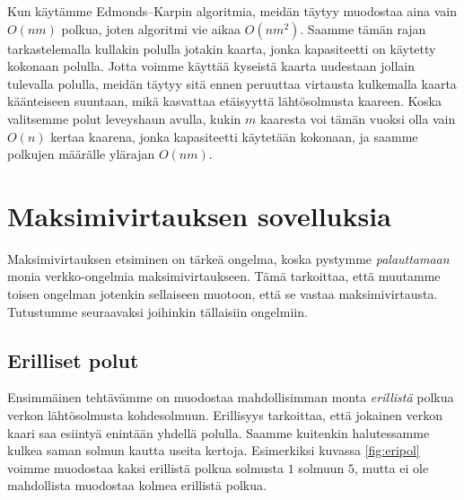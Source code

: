 Kun käytämme Edmonds–Karpin algoritmia,
meidän täytyy muodostaa aina vain $O(nm)$ polkua,
joten algoritmi vie aikaa $O(nm^2)$.
Saamme tämän rajan tarkastelemalla kullakin polulla
jotakin kaarta, jonka kapasiteetti on käytetty kokonaan polulla.
Jotta voimme käyttää kyseistä kaarta uudestaan jollain tulevalla polulla,
meidän täytyy sitä ennen peruuttaa virtausta
kulkemalla kaarta käänteiseen suuntaan,
mikä kasvattaa etäisyyttä lähtösolmusta kaareen.
Koska valitsemme polut leveyshaun avulla,
kukin $m$ kaaresta voi tämän vuoksi olla vain $O(n)$ 
kertaa kaarena, jonka kapasiteetti käytetään kokonaan,
ja saamme polkujen määrälle ylärajan $O(nm)$.

\section{Maksimivirtauksen sovelluksia}


Maksimivirtauksen etsiminen on tärkeä ongelma,
koska pystymme \emph{palauttamaan} monia verkko-ongelmia maksimivirtaukseen.
Tämä tarkoittaa, että muutamme toisen ongelman jotenkin
sellaiseen muotoon, että se vastaa maksimivirtausta.
Tutustumme seuraavaksi joihinkin tällaisiin ongelmiin.

\subsection{Erilliset polut}


Ensimmäinen tehtävämme on muodostaa mahdollisimman monta
\emph{erillistä} polkua verkon lähtösolmusta kohdesolmuun.
Erillisyys tarkoittaa, että jokainen verkon kaari saa esiintyä
enintään yhdellä polulla.
Saamme kuitenkin halutessamme kulkea saman solmun kautta useita kertoja.
Esimerkiksi kuvassa \ref{fig:eripol} voimme muodostaa
kaksi erillistä polkua solmusta $1$ solmuun $5$,
mutta ei ole mahdollista muodostaa kolmea erillistä polkua.

